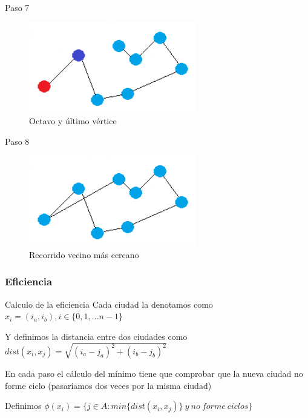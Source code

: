 \begin{frame}
	\begin{exampleblock}{Paso 7}
	\begin{figure}[htbH]
		\centering
		\includegraphics[width=0.65\textwidth]{./Imagenes/vecino7.png}
		\caption{Octavo y último vértice}
	\end{figure}
	\end{exampleblock}
\end{frame}

\begin{frame}
	\begin{exampleblock}{Paso 8}
	\begin{figure}[htbH]
		\centering
		\includegraphics[width=0.65\textwidth]{./Imagenes/vecino8.png}
		\caption{Recorrido vecino más cercano}
	\end{figure}
	\end{exampleblock}
\end{frame}


\subsubsection{Eficiencia}
\begin{frame}
	\begin{block}{Calculo de la eficiencia}
	Cada ciudad la denotamos como $x_i = (i_a,i_b), i \in \{ 0,1,...n-1 \} $
	
	Y definimos la distancia entre dos ciudades como
	$dist(x_i, x_j) = \sqrt{ (i_a-j_a)^2 + (i_b-j_b)^2 }$
	\end{block}
	
	\begin{block}{ }
	En cada paso el cálculo del mínimo tiene que comprobar que la nueva ciudad no forme
	ciclo (pasar\'iamos dos veces por la misma ciudad)
	
	Definimos 
	$\phi (x_i) = \{ j \in A : min\{ dist(x_i,x_j)\} \ y \ no \ forme \ ciclos \}$
	\end{block}
\end{frame}

